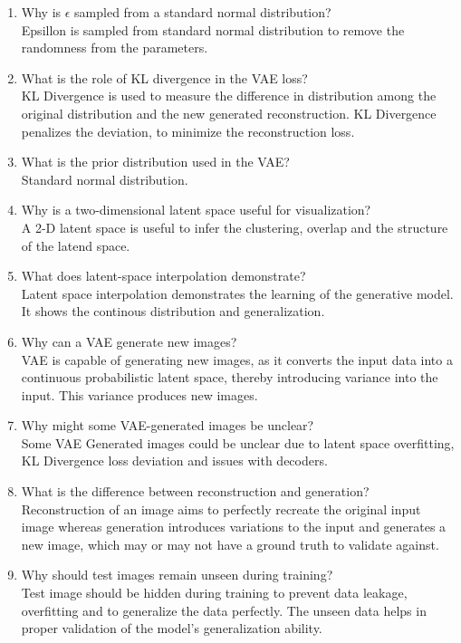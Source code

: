 \documentclass[10pt]{article}
\begin{document}
\begin{enumerate}
\item Why is $\epsilon$ sampled from a standard normal distribution?\\
\text Epsillon is sampled from standard normal distribution to remove the randomness from the parameters.

\item What is the role of KL divergence in the VAE loss?\\
\text KL Divergence is used to measure the difference in distribution among the original distribution and the new generated reconstruction. KL Divergence penalizes the deviation, to minimize the reconstruction loss.

\item What is the prior distribution used in the VAE?\\
\text Standard normal distribution.

\item Why is a two-dimensional latent space useful for visualization?\\
\text A 2-D latent space is useful to infer the clustering, overlap and the structure of the latend space.

\item What does latent-space interpolation demonstrate?\\
\text Latent space interpolation demonstrates the learning of the generative model. It shows the continous distribution and generalization.

\item Why can a VAE generate new images?\\
\text VAE is capable of generating new images, as it converts the input data into a continuous probabilistic latent space, thereby introducing variance into the input. This variance produces new images.

\item Why might some VAE-generated images be unclear?\\
\text Some VAE Generated images could be unclear due to latent space overfitting, KL Divergence loss deviation and issues with decoders.

\item What is the difference between reconstruction and generation?\\
\text Reconstruction of an image aims to perfectly recreate the original input image whereas generation introduces variations to the input and generates a new image, which may or may not have a ground truth to validate against.

\item Why should test images remain unseen during training?\\
\text Test image should be hidden during training to prevent data leakage, overfitting and to generalize the data perfectly. The unseen data helps in proper validation of the model's generalization ability.
\end{enumerate}
\end{document}
